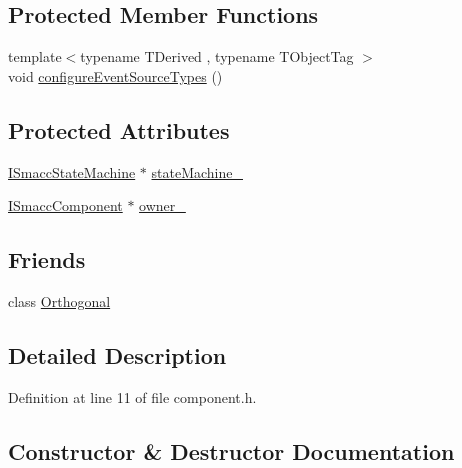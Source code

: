 \subsection*{Protected Member Functions}
\begin{DoxyCompactItemize}
\item 
{\footnotesize template$<$typename T\+Derived , typename T\+Object\+Tag $>$ }\\void \hyperlink{classsmacc_1_1ISmaccComponent_ad1c9ede43be1f83c10c6e7a2e14db8d3}{configure\+Event\+Source\+Types} ()
\end{DoxyCompactItemize}
\subsection*{Protected Attributes}
\begin{DoxyCompactItemize}
\item 
\hyperlink{classsmacc_1_1ISmaccStateMachine}{I\+Smacc\+State\+Machine} $\ast$ \hyperlink{classsmacc_1_1ISmaccComponent_ae3f37acc1679f79299b86872d4b1f80f}{state\+Machine\+\_\+}
\item 
\hyperlink{classsmacc_1_1ISmaccComponent}{I\+Smacc\+Component} $\ast$ \hyperlink{classsmacc_1_1ISmaccComponent_a8e1a9eacb9208d727756349c19f68abb}{owner\+\_\+}
\end{DoxyCompactItemize}
\subsection*{Friends}
\begin{DoxyCompactItemize}
\item 
class \hyperlink{classsmacc_1_1ISmaccComponent_ab3e0a1388d84ea577a59f487cbfc08e3}{Orthogonal}
\end{DoxyCompactItemize}


\subsection{Detailed Description}


Definition at line 11 of file component.\+h.



\subsection{Constructor \& Destructor Documentation}

